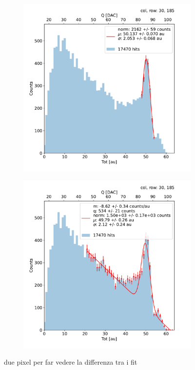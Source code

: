         \begin{figure}[h!]
            \begin{subfigure}{.5\textwidth}
            \centering
            \includegraphics[width=.99\linewidth]{figures/charaterization/fit_gauss_r185.pdf}
            \label{fig:}
            \end{subfigure}
            \begin{subfigure}{.5\textwidth}
            \centering
            \includegraphics[width=.99\linewidth]{figures/charaterization/fit_line_gauss_r185.pdf}
            \label{fig:}
            \end{subfigure}
            \caption{due pixel per far vedere la differenza tra i fit}
        \end{figure}    

